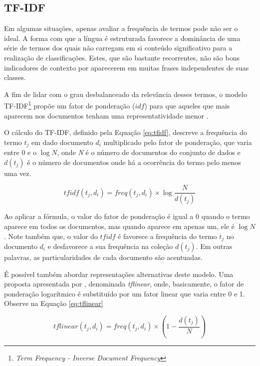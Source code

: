 \subsection{TF-IDF}

Em algumas situações, apenas avaliar a frequência de termos pode não ser o ideal. A forma com que a língua é estruturada favorece a dominância de uma série de termos dos quais não carregam em si conteúdo significativo para a realização de classificações. Estes, que são bastante recorrentes, não são bons indicadores de contexto por aparecerem em muitas frases independentes de suas classes.

A fim de lidar com o grau desbalanceado da relevância desses termos, o modelo TF-IDF\footnote{\textit{Term Frequency - Inverse Document Frequency}} propõe um fator de ponderação ($idf$) para que aqueles que mais aparecem nos documentos tenham uma representatividade menor \cite{Matsubara_Martins_Monard_2003}.

O cálculo do TF-IDF, definido pela Equação \ref{eq:tfidf}, descreve a frequência do termo $t_j$ em dado documento $d_i$ multiplicado pelo fator de ponderação, que varia entre 0 e o $\log{N}$, onde \textit{N} é o número de documentos do conjunto de dados e $d(t_j)$ é o número de documentos onde há a ocorrência do termo pelo menos uma vez.

\begin{equation}
\label{eq:tfidf}
tfidf(t_j, d_i) = freq(t_j, d_i)\times\log \frac{N}{d(t_j)}
\end{equation}

Ao aplicar a fórmula, o valor do fator de ponderação é igual a 0 quando o termo aparece em todos os documentos, mas quando aparece em apenas um, ele é $\log{N}$. Note também que, o valor do $tfidf$ é favorece a frequência do termo $t_j$ no documento $d_i$ e desfavorece a sua frequência na coleção $d(t_j)$. Em outras palavras, as particularidades de cada documento são acentuadas.

É possível também abordar representações alternativas deste modelo. Uma proposta apresentada por \citeauthor{Matsubara_Martins_Monard_2003}, denominada \textit{tflinear}, onde, basicamente, o fator de ponderação logarítmico é substituído por um fator linear que varia entre 0 e 1. Observe na Equação \ref{eq:tflinear}

\begin{equation}
\label{eq:tflinear}
tflinear(t_j, d_i) = freq(t_j, d_i)\times \left(1 - \frac{d(t_j)}{N}\right)
\end{equation}

